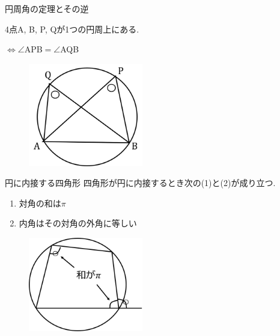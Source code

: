 \documentclass[aspectratio=169, 12pt]{beamer} %
\begin{document}
\begin{frame}{円周角の定理とその逆}
    \begin{center}
        4点A, B, P, Qが1つの円周上にある.\par
        $\Leftrightarrow \angle $APB$ = \angle $AQB
    \end{center}
    \begin{figure}[htbp]
        \begin{center}
            \includegraphics[width=50mm]{fig/5.png}
        \end{center}
    \end{figure}
\end{frame}
\begin{frame}{円に内接する四角形}
    四角形が円に内接するとき次の(1)と(2)が成り立つ.
    \begin{enumerate}
        \item 対角の和は$\pi$
        \item 内角はその対角の外角に等しい
    \end{enumerate}
    \begin{figure}[htbp]
        \begin{center}
            \includegraphics[width=50mm]{fig/6.png}
        \end{center}
    \end{figure}
\end{frame}
\end{document}
